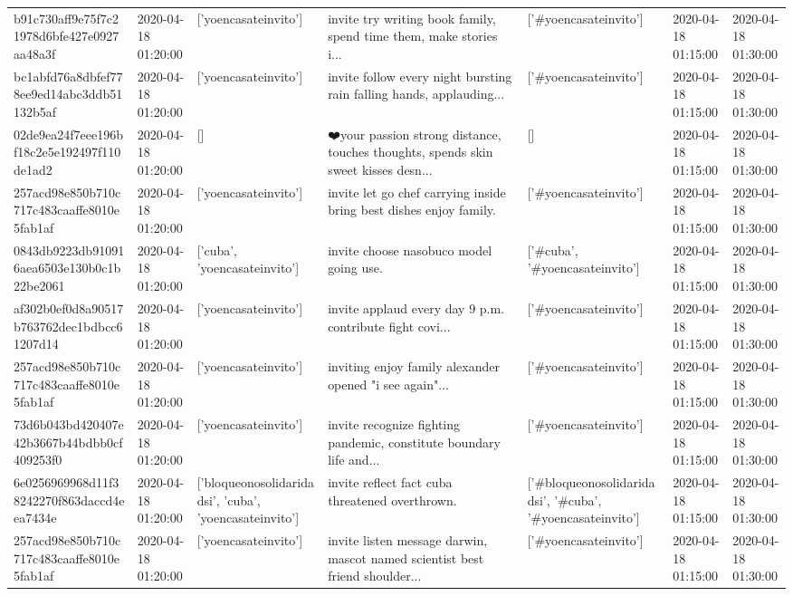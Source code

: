 \begin{tabular}{lllllll}
b91c730aff9e75f7c21978d6bfe427e0927aa48a3f & 2020-04-18 01:20:00 & ['yoencasateinvito'] & invite try writing book family, spend time them, make stories i... & ['#yoencasateinvito'] & 2020-04-18 01:15:00 & 2020-04-18 01:30:00 \\
bc1abfd76a8dbfef778ee9ed14abc3ddb51132b5af & 2020-04-18 01:20:00 & ['yoencasateinvito'] & invite follow every night bursting rain falling hands, applauding... & ['#yoencasateinvito'] & 2020-04-18 01:15:00 & 2020-04-18 01:30:00 \\
02de9ea24f7eee196bf18c2e5e192497f110de1ad2 & 2020-04-18 01:20:00 & [] & ❤️your passion strong distance, touches thoughts, spends skin sweet kisses desn... & [] & 2020-04-18 01:15:00 & 2020-04-18 01:30:00 \\
257acd98e850b710c717c483caaffe8010e5fab1af & 2020-04-18 01:20:00 & ['yoencasateinvito'] & invite let go chef carrying inside bring best dishes enjoy family. & ['#yoencasateinvito'] & 2020-04-18 01:15:00 & 2020-04-18 01:30:00 \\
0843db9223db910916aea6503e130b0c1b22be2061 & 2020-04-18 01:20:00 & ['cuba', 'yoencasateinvito'] & invite choose nasobuco model going use. & ['#cuba', '#yoencasateinvito'] & 2020-04-18 01:15:00 & 2020-04-18 01:30:00 \\
af302b0ef0d8a90517b763762dec1bdbcc61207d14 & 2020-04-18 01:20:00 & ['yoencasateinvito'] & invite applaud every day 9 p.m. contribute fight covi... & ['#yoencasateinvito'] & 2020-04-18 01:15:00 & 2020-04-18 01:30:00 \\
257acd98e850b710c717c483caaffe8010e5fab1af & 2020-04-18 01:20:00 & ['yoencasateinvito'] & inviting enjoy family alexander opened "i see again"... & ['#yoencasateinvito'] & 2020-04-18 01:15:00 & 2020-04-18 01:30:00 \\
73d6b043bd420407e42b3667b44bdbb0cf409253f0 & 2020-04-18 01:20:00 & ['yoencasateinvito'] & invite recognize fighting pandemic, constitute boundary life and... & ['#yoencasateinvito'] & 2020-04-18 01:15:00 & 2020-04-18 01:30:00 \\
6e0256969968d11f38242270f863daccd4eea7434e & 2020-04-18 01:20:00 & ['bloqueonosolidaridadsi', 'cuba', 'yoencasateinvito'] & invite reflect fact cuba threatened overthrown. & ['#bloqueonosolidaridadsi', '#cuba', '#yoencasateinvito'] & 2020-04-18 01:15:00 & 2020-04-18 01:30:00 \\
257acd98e850b710c717c483caaffe8010e5fab1af & 2020-04-18 01:20:00 & ['yoencasateinvito'] & invite listen message darwin, mascot named scientist best friend shoulder... & ['#yoencasateinvito'] & 2020-04-18 01:15:00 & 2020-04-18 01:30:00 \\

\end{tabular}
